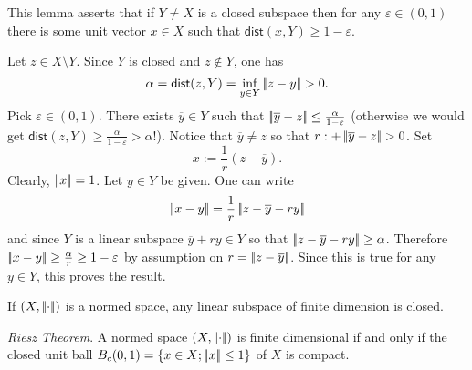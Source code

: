 \documentclass{article}
\begin{document}
\begin{remark}
	This lemma asserts that if $Y\neq X$ is a closed subspace then for any $\varepsilon\in(0,1)$ there is some unit vector $x\in X$ such that $\mathsf{dist}(x,Y)\geq 1-\varepsilon$.
\end{remark}
\begin{fancyproof}
	Let $z\in X\setminus Y$. Since $Y$ is closed and $z\notin Y$, one has
	\begin{equation*}
		\alpha=\mathsf{dist}(z,Y)=\inf_{y\in Y}\norm{z-y}>0.
	\end{equation*}
	Pick $\varepsilon\in(0,1)$. There exists $\overline{y}\in Y$ such that $\left|\negthinspace\left|\overline{y}-z\right|\negthinspace\right|\leq\frac{\alpha}{1-\varepsilon}$ (otherwise we would get $\mathsf{dist}(z,Y)\geq\frac{\alpha}{1-\varepsilon}>\alpha$!). Notice that $\overline{y}\neq z$ so that $r:+\norm{\overline{y}-z}>0$. Set 
	\begin{equation*}
		x:=\frac{1}{r}(z-\overline{y}).
	\end{equation*}
	Clearly, $\left|\negthinspace\left|x\right|\negthinspace\right|=1$. Let $y\in Y$ be given. One can write
	\begin{equation*}
		\left|\negthinspace\left|x-y\right|\negthinspace\right|=\frac{1}{r}\left|\negthinspace\left|z-\overline{y}-ry\right|\negthinspace\right|
	\end{equation*}
	and since $Y$ is a linear subspace $\overline{y}+ry\in Y$ so that $\left|\negthinspace\left|z-\overline{y}-ry\right|\negthinspace\right|\geq \alpha$. Therefore $\left|\negthinspace\left|x-y\right|\negthinspace\right|\geq\frac{\alpha}{r}\geq 1-\varepsilon$ by assumption on $r=\left|\negthinspace\left|z-\overline{y}\right|\negthinspace\right|$. Since this is true for any $y\in Y$, this proves the result.
\end{fancyproof}
\begin{lemma}
	If $\left(X,\left|\negthinspace\left|\cdot\right|\negthinspace\right|\right)$ is a normed space, any linear subspace of finite dimension is closed. 
\end{lemma}
\begin{theorem}
	\emph{Riesz Theorem}. A normed space $\left(X,\left|\negthinspace\left|\cdot\right|\negthinspace\right|\right)$ is finite dimensional if and only if the closed unit ball $B_{c}(0,1)=\left\{x\in X;\left|\negthinspace\left|x\right|\negthinspace\right|\leq 1\right\}$ of $X$ is compact.
\end{theorem}
\end{document}
